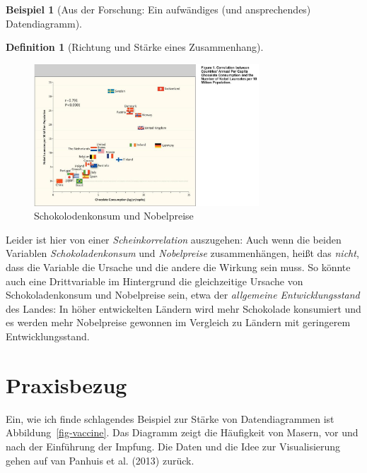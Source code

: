 \documentclass[
  a4paper,
]{scrbook}
\theoremstyle{definition}
\newtheorem{example}{Beispiel}[chapter]
\theoremstyle{definition}
\newtheorem{definition}{Definition}[chapter]
\theoremstyle{definition}
\theoremstyle{remark}
\begin{document}
\begin{example}[Aus der Forschung: Ein aufwändiges (und ansprechendes)
Datendiagramm]
\begin{definition}[Richtung und Stärke eines
Zusammenhang]
\begin{figure}
{\includegraphics[width=0.75\textwidth,height=\textheight]{img/choc.jpeg}

}

\caption{\label{fig-choc}Schokolodenkonsum und Nobelpreise}

\end{figure}%

Leider ist hier von einer \emph{Scheinkorrelation} auszugehen: Auch wenn
die beiden Variablen \emph{Schokoladenkonsum} und \emph{Nobelpreise}
zusammenhängen, heißt das \emph{nicht}, dass die Variable die Ursache
und die andere die Wirkung sein muss. So könnte auch eine Drittvariable
im Hintergrund die gleichzeitige Ursache von Schokoladenkonsum und
Nobelpreise sein, etwa der \emph{allgemeine Entwicklungsstand} des
Landes: In höher entwickelten Ländern wird mehr Schokolade konsumiert
und es werden mehr Nobelpreise gewonnen im Vergleich zu Ländern mit
geringerem Entwicklungsstand.

\section{Praxisbezug}\label{praxisbezug-3}

Ein, wie ich finde schlagendes Beispiel zur Stärke von Datendiagrammen
ist Abbildung~\ref{fig-vaccine}. Das Diagramm zeigt die Häufigkeit von
Masern, vor und nach der Einführung der Impfung. Die Daten und die Idee
zur Visualisierung gehen auf van Panhuis et al. (2013) zurück.

\begin{figure}

\end{figure}
\end{definition}
\end{example}
\end{document}
